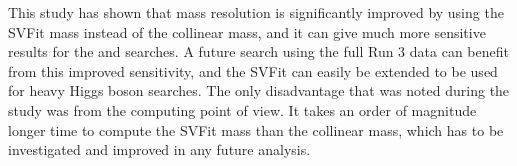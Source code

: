 This study has shown that mass resolution is significantly improved by using the SVFit mass instead of the collinear mass, and it can give much more sensitive results for the \Hmt and \Het searches. A future search using the full Run 3 data can benefit from this improved sensitivity, and the SVFit can easily be extended to be used for heavy Higgs boson searches. The only disadvantage that was noted during the study was from the computing point of view. It takes an order of magnitude longer time to compute the SVFit mass than the collinear mass, which has to be investigated and improved in any future analysis.
